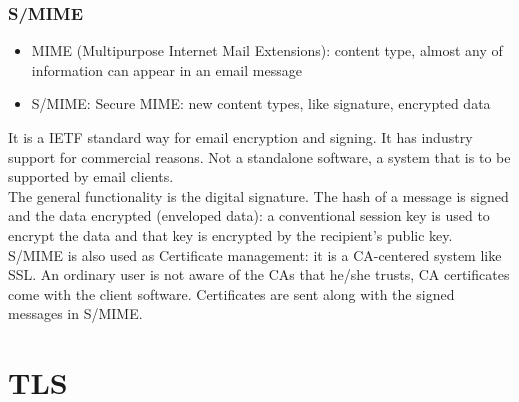 \documentclass[a4paper, 10pt, titlepage]{article}
\begin{document}
\subsubsection{S/MIME}
\begin{itemize}
\item MIME (Multipurpose Internet Mail Extensions): content type, almost any of information can appear in an email message
\item S/MIME: Secure MIME: new content types, like signature, encrypted data
\end{itemize}
It is a IETF standard way for email encryption and signing. It has industry support for commercial reasons. Not a standalone software, a system that is to be supported by email clients. \\
The general functionality is the digital signature. The hash of a message is signed and the data encrypted (enveloped data): a conventional session key is used to encrypt the data and that key is encrypted by the recipient’s public key.\\
S/MIME is also used as Certificate management: it is a CA-centered system like SSL. An ordinary user is not aware of the CAs that he/she trusts, CA certificates come with the client software. Certificates are sent along with the signed messages in S/MIME.

\newpage
\section{TLS}
\end{document}
